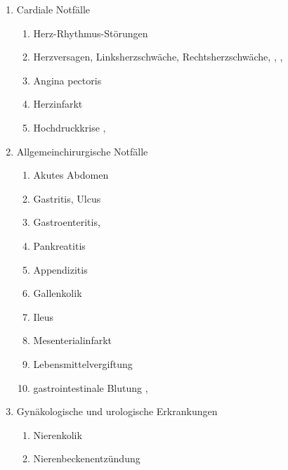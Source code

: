 \begin{enumerate}
    \item Cardiale Notfälle
    \begin{enumerate}
      \item
      Herz-Rhythmus-Störungen \dotfill {}
      \item Herzversagen,      Linksherzschwäche,      Rechtsherzschwäche, \dotfill {},       ,      
      \item Angina pectoris \dotfill {}
      \item Herzinfarkt \dotfill  {}
      \item Hochdruckkrise \dotfill  {}, 
    \end{enumerate}
    \item Allgemeinchirurgische Notfälle
    \begin{enumerate}
      \item Akutes Abdomen \dotfill {}
      \item
      Gastritis, Ulcus \dotfill {}
      \item  Gastroenteritis, \dotfill {}
      \item  Pankreatitis \dotfill {}
      \item   Appendizitis \dotfill {}
      \item   Gallenkolik \dotfill {}
      \item   Ileus \dotfill {}
      \item    Mesenterialinfarkt \dotfill {}
      \item  Lebensmittelvergiftung \dotfill {}
      \item gastrointestinale Blutung \dotfill   {},     
    \end{enumerate}
    \item Gynäkologische und urologische Erkrankungen
    \begin{enumerate}
      \item Nierenkolik \dotfill {}
      \item Nierenbeckenentzündung \dotfill {}

\end{enumerate}
\end{enumerate}
